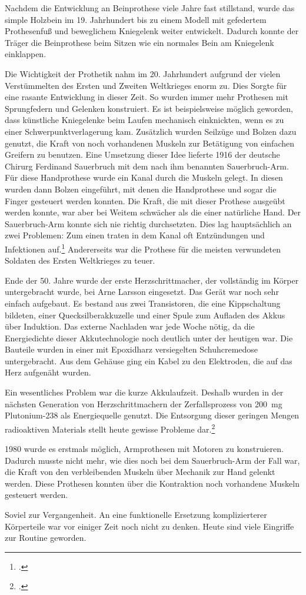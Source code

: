 Nachdem die Entwicklung an Beinprothese viele Jahre fast stillstand, wurde das simple Holzbein im 19.
Jahrhundert bis zu einem Modell mit gefedertem Prothesenfuß und beweglichem Kniegelenk weiter
entwickelt. Dadurch konnte der Träger die Beinprothese beim Sitzen wie ein normales Bein am
Kniegelenk einklappen.

Die Wichtigkeit der Prothetik nahm im 20. Jahrhundert aufgrund der vielen Verstümmelten des Ersten
und Zweiten Weltkrieges enorm zu. Dies Sorgte für eine rasante Entwicklung in dieser Zeit. So wurden
immer mehr Prothesen mit Sprungfedern und Gelenken konstruiert. Es ist beispielsweise möglich
geworden, dass künstliche Kniegelenke beim Laufen mechanisch einknickten, wenn es zu einer
Schwerpunktverlagerung kam. Zusätzlich wurden Seilzüge und Bolzen dazu genutzt, die Kraft von noch
vorhandenen Muskeln zur Betätigung von einfachen Greifern zu benutzen. Eine Umsetzung dieser Idee
lieferte 1916 der deutsche Chirurg Ferdinand Sauerbruch mit dem nach ihm benannten Sauerbruch-Arm.
Für diese Handprothese wurde ein Kanal durch die Muskeln gelegt. In diesen wurden dann Bolzen
eingeführt, mit denen die Handprothese und sogar die Finger gesteuert werden konnten. Die Kraft, die
mit dieser Prothese ausgeübt werden konnte, war aber bei Weitem schwächer als die einer natürliche
Hand. Der Sauerbruch-Arm konnte sich nie richtig durchsetzten. Dies lag hauptsächlich an zwei
Problemen: Zum einen traten in dem Kanal oft Entzündungen und Infektionen
auf.\footcite{thesis:Karpa:Geschichte_Armprothesen}
Andererseits war die
Prothese für die meisten verwundeten Soldaten des Ersten Weltkrieges zu teuer.

Ende der 50. Jahre wurde der erste Herzschrittmacher, der vollständig im Körper untergebracht wurde,
bei Arne Larsson eingesetzt. Das Gerät war noch sehr einfach aufgebaut. Es bestand aus zwei
Transistoren, die eine Kippschaltung bildeten, einer Quecksilberakkuzelle und einer Spule zum
Aufladen des Akkus über Induktion. Das externe Nachladen war jede Woche nötig, da die Energiedichte
dieser Akkutechnologie noch deutlich unter der heutigen war. Die Bauteile wurden in einer mit
Epoxidharz versiegelten Schuhcremedose untergebracht. Aus dem Gehäuse ging ein Kabel zu den
Elektroden, die auf das Herz aufgenäht wurden.

Ein wesentliches Problem war die kurze Akkulaufzeit. Deshalb wurden in der nächsten Generation
von Herzschrittmachern der Zerfallsprozess von \SI{200}{\milli\gram} Plutonium-238 als Energiequelle
genutzt. Die Entsorgung dieser geringen Mengen radioaktiven
Materials stellt heute gewisse Probleme dar.\footcite{DRadio:strahlendes_Herz}

1980 wurde es erstmals möglich, Armprothesen mit Motoren zu konstruieren. Dadurch musste nicht mehr,
wie dies noch bei dem Sauerbruch-Arm der Fall war, die Kraft von den verbleibenden Muskeln über
Mechanik zur Hand gelenkt werden. Diese Prothesen konnten über die Kontraktion noch vorhandene
Muskeln gesteuert werden.

\bigskip
Soviel zur Vergangenheit. An eine funktionelle Ersetzung komplizierterer Körperteile war vor einiger
Zeit noch nicht zu denken. Heute sind viele Eingriffe zur Routine geworden.
